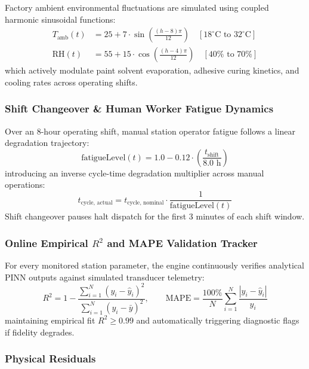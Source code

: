 \documentclass[11pt]{article}
\begin{document}
Factory ambient environmental fluctuations are simulated using coupled harmonic sinusoidal functions:
\begin{align}
T_{\text{amb}}(t) &= 25 + 7 \cdot \sin\left(\frac{(h - 8)\pi}{12}\right) \quad [18^\circ\text{C}\text{ to }32^\circ\text{C}] \\
\text{RH}(t) &= 55 + 15 \cdot \cos\left(\frac{(h - 4)\pi}{12}\right) \quad [40\%\text{ to }70\%]
\end{align}
which actively modulate paint solvent evaporation, adhesive curing kinetics, and cooling rates across operating shifts.

\subsubsection{Shift Changeover \& Human Worker Fatigue Dynamics}

Over an 8-hour operating shift, manual station operator fatigue follows a linear degradation trajectory:
\begin{equation}
\text{fatigueLevel}(t) = 1.0 - 0.12 \cdot \left(\frac{t_{\text{shift}}}{8.0\text{ h}}\right)
\end{equation}
introducing an inverse cycle-time degradation multiplier across manual operations:
\begin{equation}
t_{\text{cycle, actual}} = t_{\text{cycle, nominal}} \cdot \frac{1}{\text{fatigueLevel}(t)}
\end{equation}
Shift changeover pauses halt dispatch for the first 3 minutes of each shift window.

\subsubsection{Online Empirical $R^2$ and MAPE Validation Tracker}

For every monitored station parameter, the engine continuously verifies analytical PINN outputs against simulated transducer telemetry:
\begin{equation}
R^2 = 1 - \frac{\sum_{i=1}^{N} (y_i - \hat{y}_i)^2}{\sum_{i=1}^{N} (y_i - \bar{y})^2}, \qquad \text{MAPE} = \frac{100\%}{N}\sum_{i=1}^{N} \frac{|y_i - \hat{y}_i|}{y_i}
\end{equation}
maintaining empirical fit $R^2 \ge 0.99$ and automatically triggering diagnostic flags if fidelity degrades.

\subsubsection{Physical Residuals}
\end{document}

